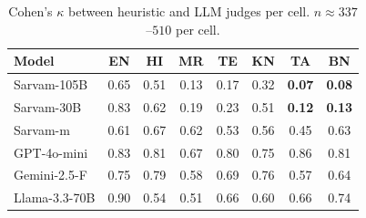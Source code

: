 \documentclass[11pt,twocolumn,a4paper]{article}
\begin{document}
\begin{table}[!t]
\centering
\caption{Cohen's $\kappa$ between heuristic and LLM judges per cell. $n \approx 337$--$510$ per cell.}
\label{tab:kappa}
\small
\begin{tabularx}{\textwidth}{lccccccc}
\toprule
Model & EN & HI & MR & TE & KN & TA & BN \\
\midrule
Sarvam-105B   & 0.65 & 0.51 & 0.13 & 0.17 & 0.32 & \textbf{0.07} & \textbf{0.08} \\
Sarvam-30B    & 0.83 & 0.62 & 0.19 & 0.23 & 0.51 & \textbf{0.12} & \textbf{0.13} \\
Sarvam-m      & 0.61 & 0.67 & 0.62 & 0.53 & 0.56 & 0.45 & 0.63 \\
GPT-4o-mini   & 0.83 & 0.81 & 0.67 & 0.80 & 0.75 & 0.86 & 0.81 \\
Gemini-2.5-F  & 0.75 & 0.79 & 0.58 & 0.69 & 0.76 & 0.57 & 0.64 \\
Llama-3.3-70B & 0.90 & 0.54 & 0.51 & 0.66 & 0.60 & 0.66 & 0.74 \\
\bottomrule
\end{tabularx}
\end{table}
\end{document}
